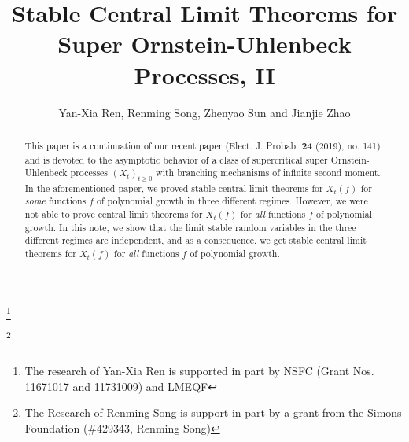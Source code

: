 \documentclass[12pt,a4paper]{amsart}
\theoremstyle{plain}
\theoremstyle{definition}
\numberwithin{equation}{section}
\begin{document}
\title
[stable CLT for super-OU processes]
{Stable Central Limit Theorems for Super Ornstein-Uhlenbeck Processes, II}
\author
[Y.-X. Ren, R. Song, Z. Sun and J. Zhao]
{Yan-Xia Ren, Renming Song, Zhenyao Sun and Jianjie Zhao}
\address{
  Yan-Xia Ren \\
  LMAM School of Mathematical Sciences \& Center for Statistical Science \\
  Peking University \\
  Beijing 100871, P. R. China}
\thanks{The research of Yan-Xia Ren is supported in part by NSFC (Grant Nos. 11671017  and 11731009) and LMEQF}
\address{
  Renming Song \\
  Department of Mathematics \\
  University of Illinois at Urbana-Champaign \\
  Urbana, IL 61801, USA}
\thanks{The Research of Renming Song is support in part by a grant from the Simons Foundation (\#429343, Renming Song)}
\address{
  Zhenyao Sun \\
  Faculty of Industrial Engineering and Management\\
  Technion, Israel Institute of Technology \\
  Haifa 3200003, Israel}
\address{
  Jianjie Zhao \\
  School of Mathematical Sciences \\
  Peking University \\
  Beijing 100871, P. R. China}

\begin{abstract}
This paper is a continuation of our recent paper (Elect. J. Probab. \textbf{24} (2019), no. 141)
and is devoted to the  asymptotic behavior of a class of supercritical super Ornstein-Uhlenbeck processes $(X_t)_{t\geq 0}$ with branching mechanisms of infinite second moment.
In the aforementioned paper, we proved stable central limit theorems for  $X_t(f) $ for {\it some} functions $f$ of polynomial growth
in three different regimes. However, we were not able to prove
central limit theorems for
$X_t(f) $ for {\it all} functions $f$ of polynomial growth.
In this note, we show that the limit stable random variables in the three different regimes are independent, and as a consequence, we get stable central limit theorems for  $X_t(f) $ for {\it all} functions $f$ of polynomial growth.
\end{abstract}
\maketitle
\end{document}
